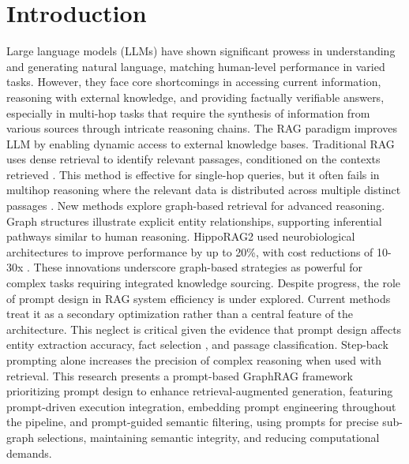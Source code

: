 \documentclass[runningheads]{llncs}
\begin{document}
\section{Introduction}
\noindent
\justifying
\sloppy
Large language models (LLMs) have shown significant prowess in understanding and generating natural language, matching human-level performance in varied tasks. However, they face core shortcomings in accessing current information, reasoning with external knowledge, and providing factually verifiable answers, especially in multi-hop tasks that require the synthesis of information from various sources through intricate reasoning chains. The RAG paradigm improves LLM by enabling dynamic access to external knowledge bases. Traditional RAG uses dense retrieval to identify relevant passages, conditioned on the contexts retrieved \cite{karpukhin2020dense}. This method is effective for single-hop queries, but it often fails in multihop reasoning where the relevant data is distributed across multiple distinct passages \cite{xiong2021answering}. New methods explore graph-based retrieval for advanced reasoning. Graph structures illustrate explicit entity relationships, supporting inferential pathways similar to human reasoning. HippoRAG2 used neurobiological architectures to improve performance by up to 20\%, with cost reductions of 10-30x \cite{gutierrez2025rag}. These innovations underscore graph-based strategies as powerful for complex tasks requiring integrated knowledge sourcing. Despite progress, the role of prompt design in RAG system efficiency is under explored. Current methods treat it as a secondary optimization rather than a central feature of the architecture. This neglect is critical given the evidence that prompt design affects entity extraction accuracy, fact selection , and passage classification. Step-back prompting alone increases the precision of complex reasoning when used with retrieval. This research presents a prompt-based GraphRAG framework prioritizing prompt design to enhance retrieval-augmented generation, featuring prompt-driven execution integration, embedding prompt engineering throughout the pipeline, and prompt-guided semantic filtering, using prompts for precise sub-graph selections, maintaining semantic integrity, and reducing computational demands.
\end{document}
